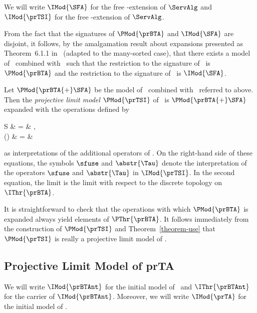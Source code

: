 \documentclass{llncs}
\begin{document}
We will write $\IMod{\SFA}$ for the free \SFA-extension of $\ServAlg$ 
and $\IMod{\prTSI}$ for the free \prTSI-extension of $\ServAlg$.

From the fact that the signatures of $\PMod{\prBTA}$ and $\IMod{\SFA}$
are disjoint, it follows, by the amalgamation result about expansions
presented as Theorem~6.1.1 in~\cite{Hod93a} (adapted to the many-sorted
case), that there exists a model of \prBTA\ combined with \SFA\ such 
that the restriction to the signature of \prBTA\ is $\PMod{\prBTA}$ and 
the restriction to the signature of \SFA\ is $\IMod{\SFA}$.

Let $\PMod{\prBTA{+}\SFA}$ be the model of \prBTA\ combined with \SFA\ 
referred to above.
Then the \emph{projective limit model} $\PMod{\prTSI}$ of \prTSI\ is
$\PMod{\prBTA{+}\SFA}$ expanded with the operations defined by
\begin{ldispl}
\begin{aeqns}
 \sfuse S & = &
\;,
\\
\abstr{\Tau}() & = &
\end{aeqns}
\end{ldispl}as interpretations of the additional operators of \prTSI.
On the right-hand side of these equations, the symbols $\sfuse$ and 
$\abstr{\Tau}$ denote the interpretation of the operators
$\sfuse$ and $\abstr{\Tau}$ in $\IMod{\prTSI}$.
In the second equation, the limit is the limit with respect to the 
discrete topology on $\IThr{\prBTA}$.

It is straightforward to check that the operations with which 
$\PMod{\prBTA}$ is expanded always yield elements of $\PThr{\prBTA}$.
It follows immediately from the construction of $\PMod{\prTSI}$ and 
Theorem~\ref{theorem-use} that $\PMod{\prTSI}$ is really a projective 
limit model of \prTSI.

\subsection{Projective Limit Model of prTA}
\label{app-prTAsi}

We will write $\IMod{\prBTAnt}$ for the initial model of \prBTAnt\ and 
$\IThr{\prBTAnt}$ for the carrier of $\IMod{\prBTAnt}$.
Moreover, we will write $\IMod{\prTA}$ for the initial model of \prTA.
\end{document}
